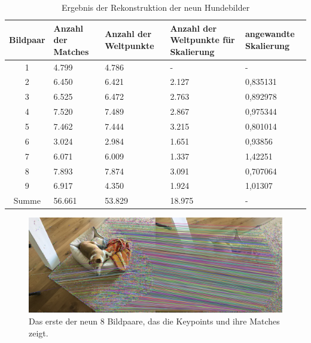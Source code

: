 \begin{table}
    \begin{tabularx}{\textwidth}{cXXXX}
        \toprule
        Bildpaar &  Anzahl der Matches & Anzahl der Weltpunkte & Anzahl der Weltpunkte für Skalierung & angewandte Skalierung \\ 
        \midrule
        1 & 4.799 & 4.786 & -  & - \\
        2 & 6.450 & 6.421 & 2.127 & 0,835131 \\
        3 & 6.525 & 6.472 & 2.763 & 0,892978 \\
        4 & 7.520 & 7.489 & 2.867 & 0,975344 \\
        5 & 7.462 & 7.444 & 3.215 & 0,801014 \\
        6 & 3.024 & 2.984 & 1.651 & 0,93856  \\
        7 & 6.071 & 6.009 & 1.337 & 1,42251  \\
        8 & 7.893 & 7.874 & 3.091 & 0,707064 \\
        9 & 6.917 & 4.350 & 1.924 & 1,01307  \\
        \midrule
        Summe & 56.661 & 53.829 & 18.975 & - \\
        \bottomrule
    \end{tabularx}
    \caption{Ergebnis der Rekonstruktion der neun Hundebilder}
    \label{tab:dog-results}
\end{table}

\begin{figure}
    \includegraphics[width=\textwidth]{src/img/dog_first_pair_with_matches.jpg}
    \caption{Das erste der neun 8 Bildpaare, das die Keypoints und ihre Matches zeigt.}
    \label{fig:dog-first-pair-with-matches}
\end{figure}

